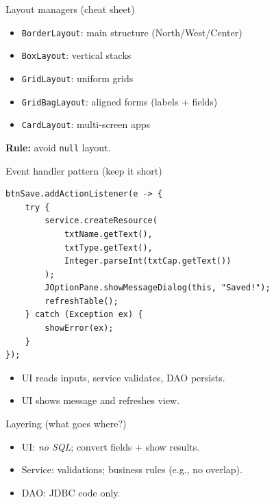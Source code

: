 \documentclass{beamer}
\begin{document}
\begin{frame}{Layout managers (cheat sheet)}
  \begin{itemize}[<+->]
    \item \texttt{BorderLayout}: main structure (North/West/Center)
    \item \texttt{BoxLayout}: vertical stacks
    \item \texttt{GridLayout}: uniform grids
    \item \texttt{GridBagLayout}: aligned forms (labels + fields)
    \item \texttt{CardLayout}: multi-screen apps
  \end{itemize}
  \textbf{Rule:} avoid \texttt{null} layout.
  \slidesources{\OOPSUnitVISources}
\end{frame}

\begin{frame}[fragile]{Event handler pattern (keep it short)}
\begin{lstlisting}
btnSave.addActionListener(e -> {
    try {
        service.createResource(
            txtName.getText(),
            txtType.getText(),
            Integer.parseInt(txtCap.getText())
        );
        JOptionPane.showMessageDialog(this, "Saved!");
        refreshTable();
    } catch (Exception ex) {
        showError(ex);
    }
});
\end{lstlisting}
  \begin{itemize}[<+->]
    \item UI reads inputs, service validates, DAO persists.
    \item UI shows message and refreshes view.
  \end{itemize}
  \slidesources{\OOPSUnitVISources}
\end{frame}

\begin{frame}{Layering (what goes where?)}
  \centering

  \vspace{0.6em}
  \begin{itemize}[<+->]
    \item UI: \textit{no SQL}; convert fields + show results.
    \item Service: validations; business rules (e.g., no overlap).
    \item DAO: JDBC code only.
  \end{itemize}
  \slidesources{\OOPSUnitVISources}
\end{frame}
\end{document}

